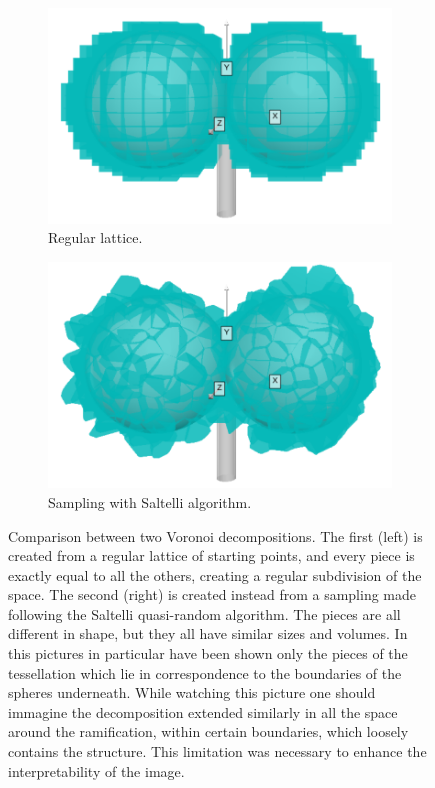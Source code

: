 \documentclass[12pt,a4paper]{report}
\begin{document}
    \begin{figure}
        \centering
        \begin{subfigure}[b]{0.45\textwidth}
             \centering
             \includegraphics[width = \textwidth]{images/reg_vor}
             \caption{Regular lattice.}
             \label{fig:reg_vor}
        \end{subfigure}
        \hfill
        \begin{subfigure}[b]{0.45\textwidth}
             \centering
             \includegraphics[width = \textwidth]{images/sal_vor}
             \caption{Sampling with Saltelli algorithm.}
             \label{fig:sal_vor}
        \end{subfigure}
        \caption{Comparison between two Voronoi decompositions. The first (left) is created from a regular lattice of starting points, and every piece is exactly equal to all the others, creating a regular subdivision of the space. The second (right) is created instead from a sampling made following the Saltelli quasi-random algorithm. The pieces are all different in shape, but they all have similar sizes and volumes. In this pictures in particular have been shown only the pieces of the tessellation which lie in correspondence to the boundaries of the spheres underneath. While watching this picture one should immagine the decomposition extended similarly in all the space around the ramification, within certain boundaries, which loosely contains the structure. This limitation was necessary to enhance the interpretability of the image. }
        \label{fig:vor_comp}
    \end{figure}
\end{document}
